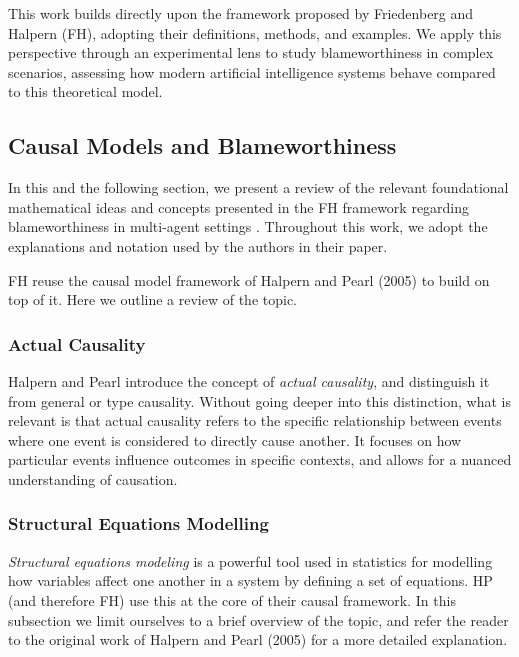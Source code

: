 \documentclass{article}
\begin{document}
This work builds directly upon the framework proposed by Friedenberg and Halpern (FH), adopting their definitions, methods, and examples. We apply this perspective through an experimental lens to study blameworthiness in complex scenarios, assessing how modern artificial intelligence systems behave compared to this theoretical model.

\subsection{Causal Models and Blameworthiness}

In this and the following section, we present a review of the relevant foundational mathematical ideas and concepts presented in the FH framework regarding blameworthiness in multi-agent settings \cite{friedenberg_blameworthiness_2019}. Throughout this work, we adopt the explanations and notation used by the authors in their paper.


FH reuse the causal model framework of Halpern and Pearl (2005) \cite{halpern_causes_2005} to build on top of it. Here we outline a review of the topic.

\subsubsection{Actual Causality}

Halpern and Pearl introduce the concept of \textit{actual causality}, and distinguish it from general or type causality. Without going deeper into this distinction, what is relevant is that actual causality refers to the specific relationship between events where one event is considered to directly cause another. It focuses on how particular events influence outcomes in specific contexts, and allows for a nuanced understanding of causation.

\subsubsection{Structural Equations Modelling}

\textit{Structural equations modeling} is a powerful tool used in statistics for modelling how variables affect one another in a system by defining a set of equations. HP (and therefore FH) use this at the core of their causal framework. In this subsection we limit ourselves to a brief overview of the topic, and refer the reader to the original work of Halpern and Pearl (2005) \cite{halpern_causes_2005} for a more detailed explanation.
\end{document}

